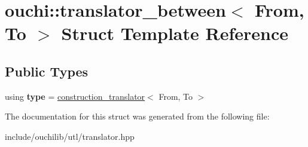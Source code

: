 \hypertarget{structouchi_1_1translator__between}{}\section{ouchi\+::translator\+\_\+between$<$ From, To $>$ Struct Template Reference}
\label{structouchi_1_1translator__between}
\subsection*{Public Types}
\begin{DoxyCompactItemize}
\item 
\mbox{\label{structouchi_1_1translator__between_ad4911f1fa443906bc5bd6a01e53bf9d7}} 
using {\bfseries type} = \mbox{\hyperlink{structouchi_1_1construction__translator}{construction\+\_\+translator}}$<$ From, To $>$
\end{DoxyCompactItemize}


The documentation for this struct was generated from the following file\+:\begin{DoxyCompactItemize}
\item 
include/ouchilib/utl/translator.\+hpp\end{DoxyCompactItemize}
